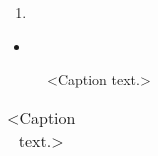 \documentclass[%





 ]{lin}
\begin{document}
\begin{enumerate}

\item

\end{enumerate}



\begin{itemize}

\item

\end{itemize}



\begin{figure}

 \centering


 \caption{\label{fig1}<Caption text.>}

\end{figure}



\begin{table}

 \centering

 \begin{tabular}{lll}

 \hline

 \end{tabular}

 \caption{\label{tab1}<Caption text.>}

\end{table}






\end{document}
